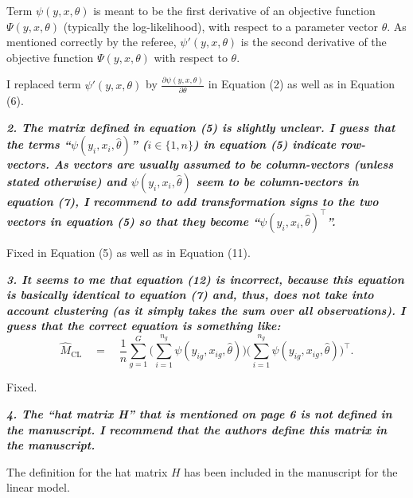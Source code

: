 \documentclass[10pt,a4paper]{article}
\begin{document}
\medskip

Term $\psi(y, x, \theta)$ is meant to be the first derivative of an objective function $\Psi(y, x, \theta)$ (typically the log-likelihood), with respect to a parameter vector $\theta$. As mentioned correctly by the referee, $\psi'(y, x, \theta)$ is the second derivative of the objective function $\Psi(y, x, \theta)$ with respect to $\theta$.

I replaced term $\psi'(y, x, \theta)$ by $\frac{\partial \psi(y, x, \theta)}{\partial\theta}$ in Equation (2) as well as in Equation (6).

\medskip

\textbf{\textit{2. The matrix defined in equation (5) is slightly unclear. I guess that the terms ``$\psi(y_i, x_i, \hat\theta)$'' ($i \in \{1, n\}$) in equation (5) indicate row-vectors. As vectors are usually assumed to be column-vectors (unless stated otherwise) and $\psi(y_i, x_i, \hat\theta)$ seem to be column-vectors in
equation (7), I recommend to add transformation signs to the two vectors in equation (5)
so that they become ``$\psi(y_i, x_i, \hat\theta)^\top$''.}}

\medskip

Fixed in Equation (5) as well as in Equation (11).

\medskip

\textbf{\textit{3. It seems to me that equation (12) is incorrect, because this equation is basically identical
to equation (7) and, thus, does not take into account clustering (as it simply takes the
sum over all observations). I guess that the correct equation is something like:
\begin{equation}
  \hat M_\mathrm{CL} \quad = \quad \frac{1}{n} \sum_{g = 1}^G\bigg(\sum_{i = 1}^{n_{g}}\psi(y_{ig}, x_{ig}, \hat \theta) \bigg) \bigg(\sum_{i = 1}^{n_{g}} \psi(y_{ig}, x_{ig}, \hat \theta) \bigg)^\top.
\end{equation}}}

\medskip

Fixed.

\medskip

\textbf{\textit{4. The ``hat matrix H'' that is mentioned on page 6 is not defined in the manuscript. I
recommend that the authors define this matrix in the manuscript.}}

\medskip

The definition for the hat matrix $H$ has been included in the manuscript for the linear model.

\medskip
\end{document}

